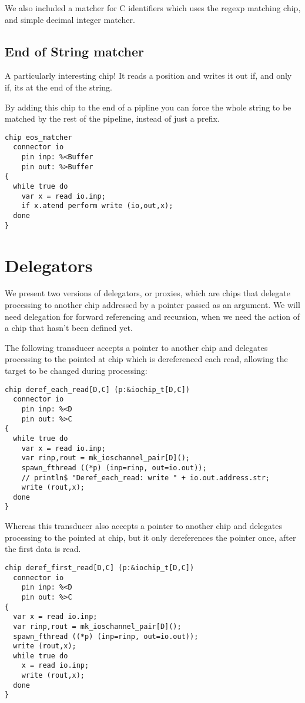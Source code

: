 \documentclass[oneside]{book}
\begin{document}
We also included a matcher for C identifiers which uses the regexp
matching chip, and simple decimal integer matcher.


\subsection{End of String matcher}
A particularly interesting chip! It reads a position
and writes it out if, and only if, its at the end of the 
string.

By adding this chip to the end of a pipline you can force
the whole string to be matched by the rest of the pipeline,
instead of just a prefix.

\begin{verbatim}
chip eos_matcher 
  connector io
    pin inp: %<Buffer
    pin out: %>Buffer
{
  while true do
    var x = read io.inp;
    if x.atend perform write (io,out,x);
  done
}
\end{verbatim}

\section{Delegators}
We present two versions of delegators, or proxies, which are chips that delegate
processing to another chip addressed by a pointer passed as an argument.
We will need delegation for forward referencing and recursion, when we need
the action of a chip that hasn't been defined yet.

The following transducer accepts a pointer to another chip and delegates
processing to the pointed at chip which is dereferenced each read,
allowing the target to be changed during processing:

\begin{verbatim}
chip deref_each_read[D,C] (p:&iochip_t[D,C]) 
  connector io
    pin inp: %<D
    pin out: %>C
{
  while true do
    var x = read io.inp;
    var rinp,rout = mk_ioschannel_pair[D]();
    spawn_fthread ((*p) (inp=rinp, out=io.out));
    // println$ "Deref_each_read: write " + io.out.address.str;
    write (rout,x);
  done
}
\end{verbatim}

Whereas this transducer also accepts a pointer to another chip
and delegates processing to the pointed at chip, but it only
dereferences the pointer once, after the first data is read.

\begin{verbatim}
chip deref_first_read[D,C] (p:&iochip_t[D,C]) 
  connector io
    pin inp: %<D
    pin out: %>C
{
  var x = read io.inp;
  var rinp,rout = mk_ioschannel_pair[D]();
  spawn_fthread ((*p) (inp=rinp, out=io.out));
  write (rout,x);
  while true do
    x = read io.inp;
    write (rout,x);
  done
}
\end{verbatim}
\end{document}

